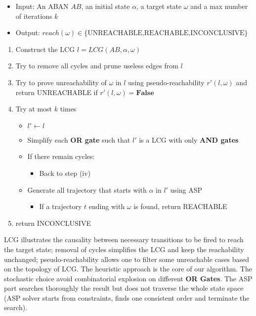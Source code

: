 \documentclass{entcs}
\begin{document}
\begin{itemize}
    \item Input: An ABAN $AB$, an initial state $\alpha$, a target state $\omega$ and a max number of iterations $k$
    \item Output: $reach(\omega)\in\{\text{UNREACHABLE,REACHABLE,INCONCLUSIVE}\}$
\end{itemize}
\begin{enumerate}
    \item Construct the LCG $l=LCG(AB,\alpha,\omega)$
    \item Try to remove all cycles and prune useless edges from $l$
    \item Try to prove unreachability of $\omega$ in $l$ using pseudo-reachability $r'(l,\omega)$ and return UNREACHABLE if $r'(l,\omega)=\textbf{False}$
    \item Try at most $k$ times
    \begin{itemize}
    \item $l'\gets l$
    \item Simplify each \textbf{OR gate} such that $l'$ is a LCG with only \textbf{AND gates}
    \item If there remain cycles:
        \begin{itemize}
            \item Back to step (iv)
        \end{itemize}
    \item Generate all trajectory that starts with $\alpha$ in $l'$ using ASP
    \begin{itemize}
        \item If a trajectory $t$ ending with $\omega$ is found, return REACHABLE
    \end{itemize}
    \end{itemize}
    \item return INCONCLUSIVE
\end{enumerate}

LCG illustrates the causality between necessary transitions to be fired to reach the target state; 
removal of cycles simplifies the LCG and keep the reachability unchanged; 
pseudo-reachability allows one to filter some unreachable cases based on the topology of LCG. 
The heuristic approach is the core of our algorithm.
The stochastic choice avoid combinatorial explosion on different \textbf{OR Gates}.
The ASP part searches thoroughly the result but does not traverse the whole state space (ASP solver starts from constraints, finds one consistent order and terminate the search). 
\end{document}
